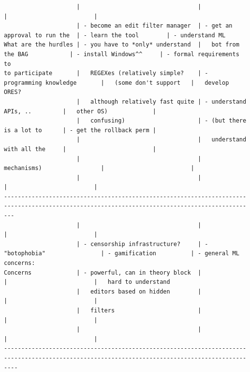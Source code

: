 \begin{verbatim}
                     |                                  |                               |                         |
                     | - become an edit filter manager  | - get an approval to run the  | - learn the tool        | - understand ML
What are the hurdles | - you have to *only* understand  |   bot from the BAG            | - install Windows^^     | - formal requirements to
to participate       |   REGEXes (relatively simple?    | - programming knowledge       |   (some don't support   |   develop ORES?
                     |   although relatively fast quite | - understand APIs, ..         |   other OS)             |
                     |   confusing)                     | - (but there is a lot to      | - get the rollback perm |
                     |                                  |   understand with all the     |                         |
                     |                                  |   mechanisms)                 |                         |
                     |                                  |                               |                         |
-----------------------------------------------------------------------------------------------------------------------------------------------
                     |                                  |                               |                         |
                     | - censorship infrastructure?     | - "botophobia"                | - gamification          | - general ML concerns:
Concerns             | - powerful, can in theory block  |                               |                         |   hard to understand
                     |   editors based on hidden        |                               |                         |
                     |   filters                        |                               |                         |
                     |                                  |                               |                         |
------------------------------------------------------------------------------------------------------------------------------------------------
\end{verbatim}

